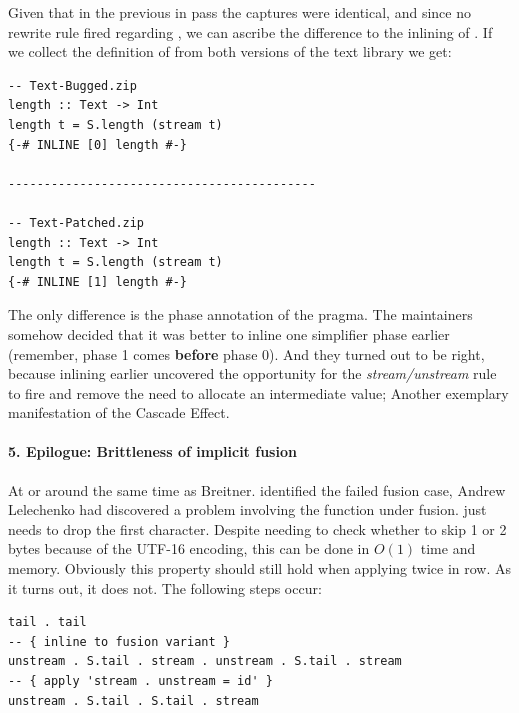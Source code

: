Given that in the previous in pass the captures were identical, and since no rewrite rule fired regarding ,
we can ascribe the difference to the inlining of . If we collect the definition of  from both versions
of the text library we get:

\begin{listing}[H]
\begin{verbatim}
-- Text-Bugged.zip
length :: Text -> Int
length t = S.length (stream t)
{-# INLINE [0] length #-}

-------------------------------------------

-- Text-Patched.zip
length :: Text -> Int
length t = S.length (stream t)
{-# INLINE [1] length #-}
\end{verbatim}
\end{listing}

The only difference is the phase annotation of the  pragma. The maintainers somehow decided that it was better
to inline  one simplifier phase earlier (remember, phase 1 comes \textbf{before} phase 0). And they turned out to be right,
because inlining earlier uncovered the opportunity for the \textit{stream/unstream} rule to fire and remove 
the need to allocate an intermediate  value; Another exemplary manifestation of the Cascade Effect.

\paragraph{5. Epilogue: Brittleness of implicit fusion}
At or around the same time as Breitner. \cite{inspection_testing} identified the failed fusion case, Andrew Lelechenko had discovered
a problem involving the  function \cite{two_tails} under fusion.  just needs to drop the first character.
Despite needing to check whether to skip 1 or 2 bytes because of the UTF-16 encoding, this can be done in $O(1)$ time and memory.
Obviously this property should still hold when applying  twice in row. As it turns out, it does not. The following steps occur:

\begin{listing}[H]
\begin{verbatim}
tail . tail
-- { inline to fusion variant }
unstream . S.tail . stream . unstream . S.tail . stream
-- { apply 'stream . unstream = id' }
unstream . S.tail . S.tail . stream
\end{verbatim}
\end{listing}

